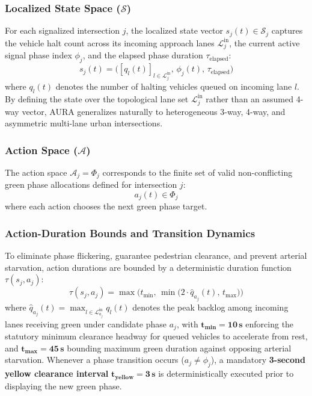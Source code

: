 \subsubsection{Localized State Space ($\mathcal{S}$)}
For each signalized intersection $j$, the localized state vector $s_j(t) \in \mathcal{S}_j$ captures the vehicle halt count across its incoming approach lanes $\mathcal{L}_j^{\text{in}}$, the current active signal phase index $\phi_j$, and the elapsed phase duration $\tau_{\text{elapsed}}$:
\begin{equation}
s_j(t) = \Big( [q_l(t)]_{l \in \mathcal{L}_j^{\text{in}}}, \, \phi_j(t), \, \tau_{\text{elapsed}} \Big)
\label{eq:state}
\end{equation}
where $q_l(t)$ denotes the number of halting vehicles queued on incoming lane $l$. By defining the state over the topological lane set $\mathcal{L}_j^{\text{in}}$ rather than an assumed 4-way vector, AURA generalizes naturally to heterogeneous 3-way, 4-way, and asymmetric multi-lane urban intersections.

\subsubsection{Action Space ($\mathcal{A}$)}
The action space $\mathcal{A}_j = \Phi_j$ corresponds to the finite set of valid non-conflicting green phase allocations defined for intersection $j$:
\begin{equation}
a_j(t) \in \Phi_j
\label{eq:action}
\end{equation}
where each action chooses the next green phase target.

\subsubsection{Action-Duration Bounds and Transition Dynamics}
To eliminate phase flickering, guarantee pedestrian clearance, and prevent arterial starvation, action durations are bounded by a deterministic duration function $\tau(s_j, a_j)$:
\begin{equation}
\tau(s_j, a_j) = \max\Big(t_{\min}, \, \min\big(2 \cdot \hat{q}_{a_j}(t), \, t_{\max}\big)\Big)
\label{eq:duration}
\end{equation}
where $\hat{q}_{a_j}(t) = \max_{l \in \mathcal{L}_{a_j}^{\text{in}}} q_l(t)$ denotes the peak backlog among incoming lanes receiving green under candidate phase $a_j$, with $\mathbf{t_{\min} = 10\,\text{s}}$ enforcing the statutory minimum clearance headway for queued vehicles to accelerate from rest, and $\mathbf{t_{\max} = 45\,\text{s}}$ bounding maximum green duration against opposing arterial starvation. Whenever a phase transition occurs ($a_j \ne \phi_j$), a mandatory \textbf{3-second yellow clearance interval} $\mathbf{t_{\text{yellow}} = 3\,\text{s}}$ is deterministically executed prior to displaying the new green phase.

